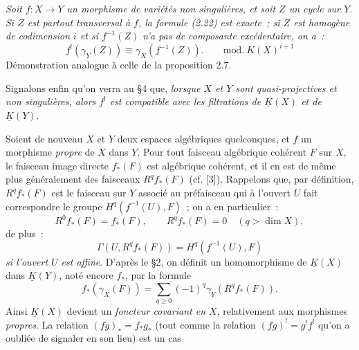 \emph{Soit $f:X\longrightarrow Y$ un morphisme de variétés non singulières, et soit $Z$ un cycle sur $Y$. Si $Z$ est partout transversal à $f$, la formule (2.22) est exacte~; si $Z$ est homogène de codimension $i$ et si $f^{-1}(Z)$ n'a pas de composante excédentaire, on a~:}
\begin{equation}\tag{2.23}
 f^!(\gamma_Y(Z))\equiv\gamma_X(f^{-1}(Z)).\qquad\mathrm{mod.}\ \underline K(X)^{i+1}
\end{equation}
Démonstration analogue à celle de la proposition 2.7.

Signalons enfin qu'on verra au \S 4 que, \emph{lorsque $X$ et $Y$ sont quasi-projectives et non singulières, alors $f^!$ est compatible avec les filtrations de $\underline K(X)$ et de $\underline K(Y)$}.

Soient de nouveau $X$ et $Y$ deux espaces algébriques quelconques, et $f$ un morphisme \emph{propre} de $X$ dans $Y$. Pour tout faisceau algébrique cohérent $F$ sur $X$, le faisceau image directe $f_*(F)$ est algébrique cohérent, et il en est de même plus généralement des faisceaux $R^qf_*(F)$ (cf. [3]). Rappelons que, par définition, $R^qf_*(F)$ est le faisceau sur $Y$ associé au préfaisceau qui à l'ouvert $U$ fait correspondre le groupe $H^q(f^{-1}(U),F)$~; on a en particulier~:
\begin{equation}\tag{2.24}
 R^0f_*(F)=f_*(F),\qquad R^qf_*(F)=0\quad(q>\dim X),
\end{equation}
de plus~:
\begin{equation}\tag{2.25}
 \Gamma(U,R^qf_*(F))=H^q(f^{-1}(U),F)
\end{equation}
\emph{si l'ouvert $U$ est affine}. D'après le \S 2, on définit un homomorphisme de $\underline K(X)$ dans $\underline K(Y)$, noté encore $f_*$, par la formule
\begin{equation}\tag{2.26}
 f_*(\gamma_X(F))=\sum_{q\geq0}(-1)^q\gamma_Y(R^qf_*(F)).
\end{equation}
Ainsi $\underline K(X)$ devient un \emph{foncteur covariant en $X$}, relativement aux morphismes \emph{propres}. La relation $(fg)_*=f_*g_*$ (tout comme la relation $(fg)^!=g^!f^!$ qu'on a oubliée de signaler en son lieu) est un cas
